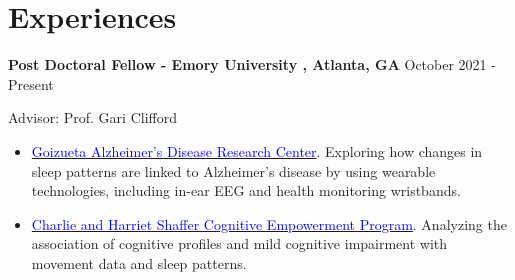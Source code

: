 \documentclass[margin, line]{res}
\newenvironment{list1}{
  \begin{list}{\ding{113}}{%
      \setlength{\itemsep}{0in}
      \setlength{\parsep}{0in} \setlength{\parskip}{0in}
      \setlength{\topsep}{0in} \setlength{\partopsep}{0in} 
      \setlength{\leftmargin}{0.17in}}}{\end{list}}
\newenvironment{list2}{
  \begin{list}{$\bullet$}{%
      \setlength{\itemsep}{0in}
      \setlength{\parsep}{0in} \setlength{\parskip}{0in}
      \setlength{\topsep}{0in} \setlength{\partopsep}{0in} 
      \setlength{\leftmargin}{0.2in}}}{\end{list}}
\begin{document}
\begin{resume}
\begin{list1}
\end{list1}

\begin{itemize}
\renewcommand\labelitemi{\scriptsize$\blacksquare$}


\end{itemize}
\section{\sc  \textbf{\large{Experiences}}}

\begin{list1}

\item[] \textbf{Post Doctoral Fellow - Emory University , Atlanta, GA}\hspace*{\fill} October 2021 - Present
\item[]Advisor: Prof. Gari Clifford

			\begin{itemize}
            \item \href{https://alzheimers.emory.edu}{{\textcolor{blue}{Goizueta Alzheimer's Disease Research Center}}}. Exploring how changes in sleep patterns are linked to Alzheimer’s disease by using wearable technologies, including in-ear EEG and health monitoring wristbands.
		   	\item \href{https://empowerment.emory.edu}{{\textcolor{blue}{Charlie and Harriet Shaffer Cognitive Empowerment Program}}}. Analyzing the association of cognitive profiles and mild cognitive impairment with movement data and sleep patterns.
      \begin{itemize}
      \begin{itemize}



\end{itemize}
\end{itemize}
\end{itemize}
\end{list1}
\end{resume}
\end{document}
